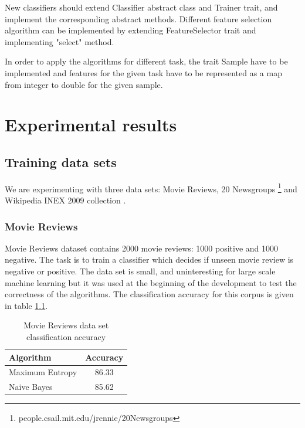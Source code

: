 \documentclass{report}
\begin{document}
New classifiers should extend Classifier abstract class and Trainer trait, and implement the corresponding abstract methods. Different feature selection algorithm can be implemented by extending FeatureSelector trait and implementing "select" method.

In order to apply the algorithms for different task, the trait Sample have to be implemented and features for the given task have to be represented as a map from integer to double for the given sample.

\chapter{Experimental results}

\section{Training data sets}

We are experimenting with three data sets: Movie Reviews\cite{Pang+Lee:04a}, 20 Newsgroups \footnote{people.csail.mit.edu/jrennie/20Newsgroups} and Wikipedia INEX 2009 collection \cite{conf/btw/SchenkelSK07}.

\subsection{Movie Reviews}

Movie Reviews dataset contains 2000 movie reviews: 1000 positive and 1000 negative. The task is to train a classifier which decides if unseen movie review is negative or positive. The data set is small, and uninteresting for large scale machine learning but it was used at the beginning of the development to test the correctness of the algorithms. The classification accuracy for this corpus is given in table \ref{table:mrprecision}. 

\begin{table}[ht]
\centering
\begin{tabular}{ l c }
    \hline\hline
    Algorithm & Accuracy \\ [0.2ex]
    \hline
    Maximum Entropy &  86.33 \\ %
    Naive Bayes & 85.62 \\ %
    \hline
  \end{tabular}
\label{table:mrprecision}
\caption{Movie Reviews data set classification accuracy}
\end{table}
\end{document}
